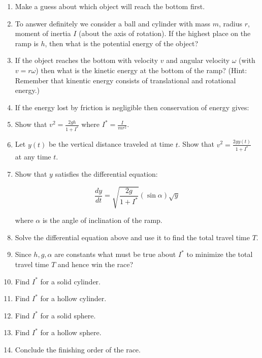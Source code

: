 \documentclass[11pt]{article}
\begin{document}
\begin{enumerate}
\item Make a guess about which object will reach the bottom first.


\item To answer definitely we consider a ball and cylinder with mass $m$, radius $r$, moment of inertia $I$ (about the axis of rotation). If the highest place on the ramp is $h$, then what is the potential energy of the object?


\item If the object reaches the bottom with velocity $v$ and angular velocity $\omega$ (with $v = r\omega$)  then what is the kinetic energy at the bottom of the ramp? (Hint: Remember that kinentic energy consists of translational and rotational energy.)

\item If the energy lost by friction is negligible then conservation of energy gives:


\item Show that $\displaystyle v^2 = \frac{2gh}{1+I^*}$ where $\displaystyle I^* = \frac{I}{mr^2}$.

\item Let $y(t)$ be the vertical distance traveled at time $t$. Show that $\displaystyle v^2 = \frac{2gy(t)}{1+I^*}$ at any time $t$.

\item Show that $y$ satisfies the differential equation:

$$\frac{dy}{dt} = \sqrt{\frac{2g}{1+I^*}}(\sin \alpha ) \sqrt{y}$$

where $\alpha$ is the angle of inclination of the ramp.

\item Solve the differential equation above and use it to find the total travel time $T$.


\item Since $h, g, \alpha$ are constants what must be true about $I^*$ to minimize the total travel time $T$ and hence win the race?


\item Find $I^*$ for a solid cylinder.

\item Find $I^*$ for a hollow cylinder.

\item Find $I^*$ for a solid sphere. 

\item Find $I^*$ for a hollow sphere.

\item Conclude the finishing order of the race.



\end{enumerate}
\end{document}

